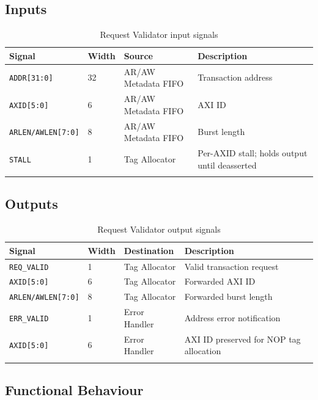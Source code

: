 \subsection{Inputs}

\begin{longtable}{llll}
\toprule
\textbf{Signal} & \textbf{Width} & \textbf{Source} & \textbf{Description} \\
\midrule
\texttt{ADDR[31:0]}        & 32 & AR/AW Metadata FIFO & Transaction address \\
\texttt{AXID[5:0]}         & 6  & AR/AW Metadata FIFO & AXI ID \\
\texttt{ARLEN/AWLEN[7:0]}  & 8  & AR/AW Metadata FIFO & Burst length \\
\texttt{STALL}             & 1  & Tag Allocator       & Per-AXID stall; holds output until deasserted \\
\bottomrule
\caption{Request Validator input signals}
\end{longtable}

\subsection{Outputs}

\begin{longtable}{llll}
\toprule
\textbf{Signal} & \textbf{Width} & \textbf{Destination} & \textbf{Description} \\
\midrule
\texttt{REQ\_VALID}       & 1 & Tag Allocator & Valid transaction request \\
\texttt{AXID[5:0]}        & 6 & Tag Allocator & Forwarded AXI ID \\
\texttt{ARLEN/AWLEN[7:0]} & 8 & Tag Allocator & Forwarded burst length \\
\texttt{ERR\_VALID}       & 1 & Error Handler & Address error notification \\
\texttt{AXID[5:0]}        & 6 & Error Handler & AXI ID preserved for NOP tag allocation \\
\bottomrule
\caption{Request Validator output signals}
\end{longtable}

\subsection{Functional Behaviour}

